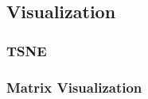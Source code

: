 \documentclass[12pt]{ociamthesis}  %
\begin{document}
\subsection{Visualization}
\subsubsection{TSNE}
\subsubsection{Matrix Visualization}


\renewcommand{\bibname}{References}
\end{document}
